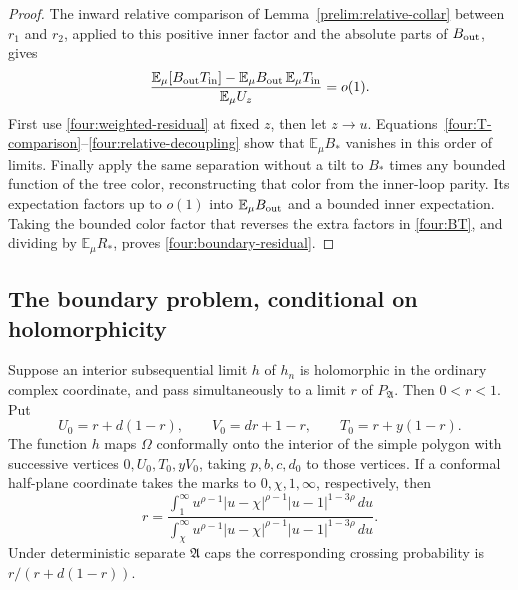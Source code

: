 \begin{proof}
The inward relative comparison of Lemma~\ref{prelim:relative-collar}
between $r_1$ and $r_2$, applied
to this positive inner factor and the absolute parts of $B_{\rm out}$,
gives
\begin{equation}
 \frac{\mathbb E_\mu[B_{\rm out}T_{\rm in}]
 -\mathbb E_\mu B_{\rm out}\,\mathbb E_\mu T_{\rm in}}
 {\mathbb E_\mu U_z}=o(1).
 \label{four:relative-decoupling}
\end{equation}
First use \eqref{four:weighted-residual} at fixed $z$, then let $z\to u$.
Equations~\eqref{four:T-comparison}--\eqref{four:relative-decoupling}
show that $\mathbb E_\mu B_*$ vanishes in this order of limits.
Finally apply the same separation without a tilt to $B_*$ times any
bounded function of the tree color, reconstructing that color from the
inner-loop parity.  Its expectation factors up to $o(1)$ into
$\mathbb E_\mu B_{\rm out}$ and a bounded inner expectation.
Taking the bounded color factor that reverses the extra factors in
\eqref{four:BT}, and dividing by $\mathbb E_\mu R_*$, proves
\eqref{four:boundary-residual}.
\end{proof}

\subsection{The boundary problem, conditional on holomorphicity}

\begin{proposition}
\label{four:conditional-map}
Suppose an interior subsequential limit $h$ of $h_n$ is holomorphic in
the ordinary complex coordinate, and pass simultaneously to a limit
$r$ of $P_{\mathfrak A}$.  Then $0<r<1$.  Put
\begin{equation}
 U_0=r+d(1-r),\qquad V_0=dr+1-r,\qquad T_0=r+y(1-r).
 \label{four:target-vertices}
\end{equation}
The function $h$ maps $\Omega$ conformally onto the interior of the
simple polygon with successive vertices $0,U_0,T_0,yV_0$, taking
$p,b,c,d_0$ to those vertices.  If a conformal half-plane coordinate
takes the marks to $0,\chi,1,\infty$, respectively, then
\begin{equation}
 r=\frac{\displaystyle\int_1^\infty
        u^{\rho-1}|u-\chi|^{\rho-1}|u-1|^{1-3\rho}\,du}
       {\displaystyle\int_\chi^\infty
        u^{\rho-1}|u-\chi|^{\rho-1}|u-1|^{1-3\rho}\,du}.
 \label{four:crossing-formula}
\end{equation}
Under deterministic separate $\mathfrak A$ caps the corresponding
crossing probability is $r/(r+d(1-r))$.
\end{proposition}

